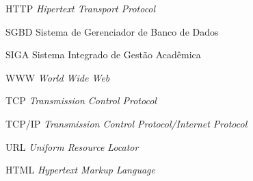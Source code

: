 \begin{siglas}
  \item[HTTP] \textit{Hipertext Transport Protocol}
  \item[SGBD] Sistema de Gerenciador de Banco de Dados
  \item[SIGA] Sistema Integrado de Gestão Acadêmica
  \item[WWW] \textit{World Wide Web}
  \item[TCP] \textit{Transmission Control Protocol}
  \item[TCP/IP] \textit{Transmission Control Protocol/Internet Protocol	}
  \item[URL] \textit{Uniform Resource Locator}
  \item[HTML] \textit{Hypertext Markup Language}
\end{siglas}
